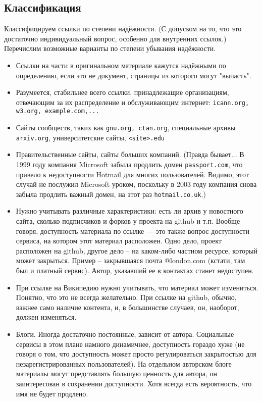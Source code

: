 \documentclass[10pt, a5paper]{article}
\begin{document}
\subsection*{Классификация}

Классифицируем  ссылки  по  степени
надёжности. (С  допуском  на  то,  что  это  достаточно  
индивидуальный  вопрос, особенно для внутренних ссылок.)
Перечислим возможные варианты по степени убывания надёжности.
\begin{itemize}
\item Ссылки на части в оригинальном материале кажутся надёжными по 
определению, если это не документ, страницы из которого могут "выпасть".  
\item Разумеется, стабильнее всего ссылки,  принадлежащие  организациям,
отвечающим за их распределение и обслуживающим интернет:  
\texttt{icann.org,  w3.org,  example.com,...}
\item Сайты сообществ, таких как \texttt{gnu.org,  ctan.org}, специальные
архивы \texttt{arxiv.org}, университетские сайты, \texttt{<site>.edu}
\item Правительственные  сайты,   сайты   больших   компаний.   (Правда
бывает... В 1999  году  компания  Microsoft  забыла  продлить  домен
\texttt{passport.com},  что  привело  к  недоступности  Hotmail  для   многих
пользователей. Видимо, этот случай  не  послужил  Microsoft  уроком,
поскольку в 2003 году компания снова забыла продлить  важный  домен,
на этот раз \texttt{hotmail.co.uk}.\cite{AY1})
\item Нужно  учитывать  различные  характеристики:  есть  ли  архив   у
новостного сайта, сколько подписчиков и форков у проекта  на  github
и т.п.
    Вообще говоря, доступность  материала  по  ссылке  —  это  также
вопрос доступности сервиса, на  котором  этот  материал  расположен.
Одно дело, проект расположен на github, другое дело – на  каком-либо
частном ресурсе,  который  может  закрыться.  Пример  –  закрывшаяся
почта  @london.com  (кстати,  там  был  и  платный  сервис).  Автор,
указавший ее в контактах станет недоступен.
\item При ссылке  на  Википедию  нужно  учитывать,  что  материал  может
измениться. Понятно, что это не всегда  желательно.  При  ссылке  на
github, обычно, важнее  само  наличие  контента,  и,  в  большинстве
случаев, он, наоборот, должен изменяться.
\item Блоги.  Иногда  достаточно   постоянные,   зависит   от   автора.
Социальные сервисы в  этом  плане  намного динамичнее,  доступность
гораздо  хуже  (не  говоря  о  том,  что  доступность  может  просто
регулироваться закрытостью для незарегистрированных  пользователей).
На отдельном авторском блоге материалы  могут  представлять  большую
ценность для автора,  он  заинтересован  в  сохранении  доступности.
Хотя всегда есть вероятность, что имя не будет продлено.
\end{itemize}
\end{document}
